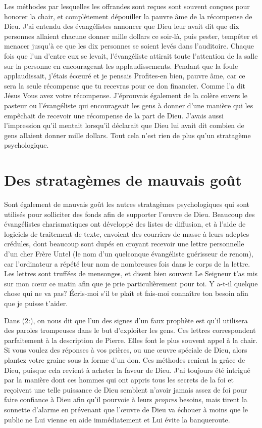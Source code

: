 Les méthodes par lesquelles les offrandes sont reçues
 sont souvent conçues pour honorer la chair, et complètement dépouiller
 la pauvre âme de la récompense de Dieu. J'ai entendu des évangélistes
 annoncer que Dieu leur avait dit que dix personnes allaient chacune donner
 mille dollars ce soir-là, puis pester, tempêter et menacer jusqu'à
 ce que les dix personnes se soient levés dans l'auditoire. Chaque fois que l'un d'entre eux
 se levait, l'évangéliste attirait toute l'attention de la salle sur la personne
 en encourageant les applaudissements. Pendant que la foule applaudissait,
 j'étais écœuré et je pensais\frcolon{} \Og Profites-en bien, pauvre âme,
 car ce sera la seule récompense que tu recevras pour ce don financier. \Fg{}
 Comme l'a dit Jésus\frcolon{} \Og Vous avez votre récompense. \Fg{}
 J'éprouvais également de la colère envers le pasteur
 ou l'évangéliste qui encourageait les gens à donner d'une manière
 qui les empêchait de recevoir une récompense de la part de Dieu.
 J'avais aussi l'impression qu'il mentait lorsqu'il déclarait
 que Dieu lui avait dit combien de gens allaient donner mille dollars.
 Tout cela n'est rien de plus qu'un stratagème psychologique.


\section{Des stratag\`emes de mauvais go\^ut}

Sont également de mauvais goût les autres stratagèmes psychologiques
 qui sont utilisés pour solliciter des fonds afin de supporter l'œuvre
 de Dieu. Beaucoup des évangélistes charismatiques ont développé
 des listes de diffusion, et à l'aide de logiciels de traitement
 de texte, envoient des courriers de masse à leurs adeptes crédules,
 dont beaucoup sont dupés en croyant recevoir une lettre personnelle
 d'un cher Frère Untel (le nom d'un quelconque évangéliste guérisseur
 de renom), car l'ordinateur a répété leur nom de nombreuses fois
 dans le corps de la lettre. Les lettres sont truffées de mensonges,
 et disent bien souvent\frcolon{} \Og Le Seigneur t'as mis sur mon cœur
 ce matin afin que je prie particulièrement pour toi.
 Y a-t-il quelque chose qui ne va pas? Écris-moi s'il te plaît
 et fais-moi connaître ton besoin afin que je puisse t'aider. \Fg{}

Dans (2:), on nous dit que l'un des signes
 d'un faux prophète est qu'il utilisera des paroles trompeuses
 dans le but d'ex\-ploi\-ter les gens. Ces lettres correspondent parfaitement
 à la description de Pierre. Elles font le plus souvent appel à la chair.
 Si vous voulez des réponses à vos prières, ou une œuvre spéciale de Dieu,
 alors plantez votre graine sous la forme d'un don.
 Ces méthodes renient la grâce de Dieu, puisque cela revient à acheter
 la faveur de Dieu. J'ai toujours été intrigué par la manière dont
 ces hommes qui ont appris tous les secrets de la foi
 et reçoivent une telle puissance de Dieu semblent n'avoir jamais assez
 de foi pour faire confiance à Dieu afin qu'il pourvoie
 à leurs \emph{propres} besoins, mais tirent la sonnette d'alarme en prévenant que l'œuvre de Dieu
 va échouer à moins que le public ne Lui vienne en aide
 immédiatement et Lui évite la banqueroute.


